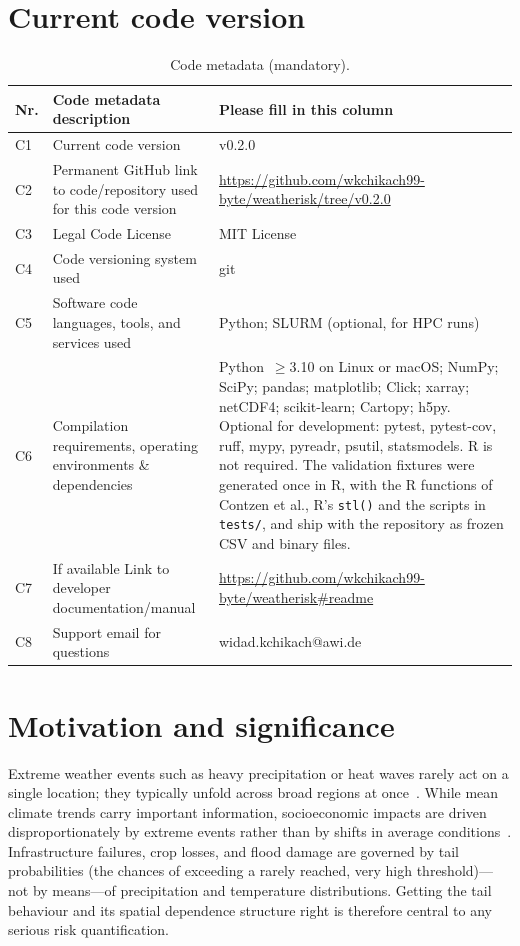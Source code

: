 \documentclass[preprint,12pt,a4paper]{elsarticle}
\begin{document}
\section*{Current code version}

\begin{table}[H]
\small
\begin{tabularx}{\textwidth}{|l|>{\raggedright\arraybackslash}p{4.9cm}|>{\raggedright\arraybackslash}X|}
\hline
\textbf{Nr.} & \textbf{Code metadata description} & \textbf{Please fill in this column} \\
\hline
C1 & Current code version & v0.2.0 \\
\hline
C2 & Permanent GitHub link to code/repository used for this code version &
  \url{https://github.com/wkchikach99-byte/weatherisk/tree/v0.2.0} \\
\hline
C3 & Legal Code License & MIT License \\
\hline
C4 & Code versioning system used & git \\
\hline
C5 & Software code languages, tools, and services used &
  Python; SLURM (optional, for HPC runs) \\
\hline
C6 & Compilation requirements, operating environments
  \& dependencies &
  Python~$\geq$3.10 on Linux or macOS; NumPy; SciPy; pandas; matplotlib;
  Click; xarray; netCDF4; scikit-learn; Cartopy; h5py.
  Optional for development: pytest, pytest-cov, ruff, mypy, pyreadr,
  psutil, statsmodels. R is not required. The validation fixtures
  were generated once in R, with the R functions of Contzen
  et al., R's \texttt{stl()} and the scripts in
  \texttt{tests/}, and ship with the repository as frozen CSV and
  binary files. \\
\hline
C7 & If available Link to developer documentation/manual &
  \url{https://github.com/wkchikach99-byte/weatherisk\#readme} \\
\hline
C8 & Support email for questions & widad.kchikach@awi.de \\
\hline
\end{tabularx}
\caption{Code metadata (mandatory).}
\label{tab:metadata}
\end{table}

\section{Motivation and significance}
\label{sec:motivation}

Extreme weather events such as heavy precipitation or heat waves
rarely act on a single location; they typically unfold across broad
regions at once~\cite{davison2012}. While mean climate trends carry important information,
socioeconomic impacts are driven disproportionately by extreme events
rather than by shifts in average conditions~\cite{davison2012}. Infrastructure
failures, crop losses, and flood damage are governed by tail
probabilities (the chances of exceeding a rarely reached, very high
threshold)---not by means---of precipitation and temperature
distributions. Getting the tail behaviour and its spatial dependence
structure right is therefore central to any serious risk
quantification.
\end{document}
